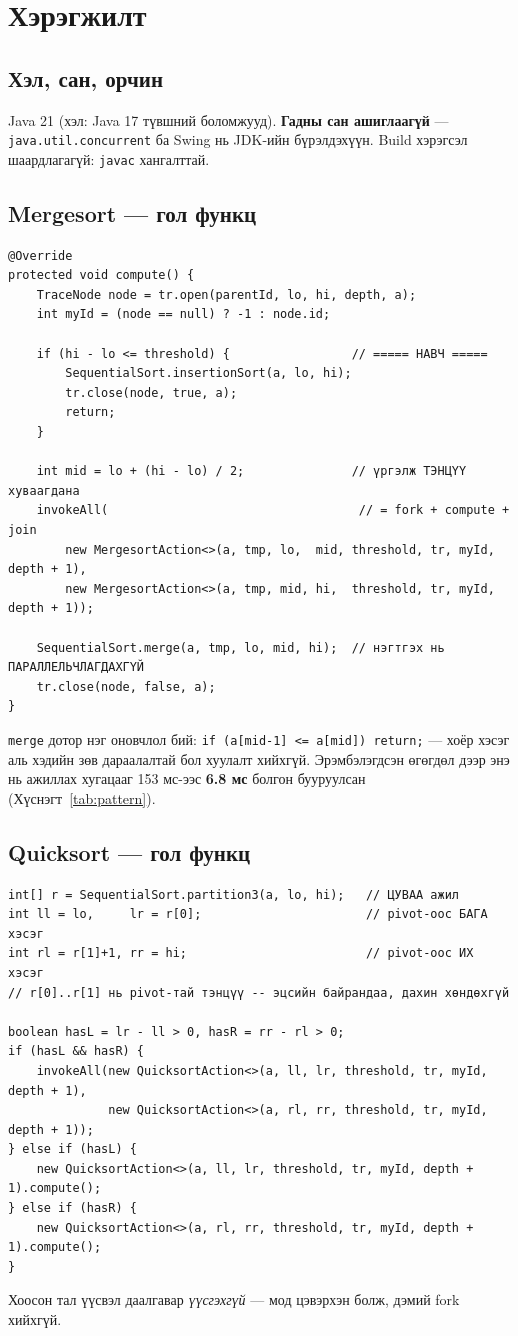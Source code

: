 \documentclass[11pt,a4paper]{article}
\begin{document}
\section{Хэрэгжилт}

\subsection{Хэл, сан, орчин}
Java 21 (хэл: Java 17 түвшний боломжууд). \textbf{Гадны сан ашиглаагүй} ---
\texttt{java.util.concurrent} ба Swing нь JDK-ийн бүрэлдэхүүн. Build хэрэгсэл
шаардлагагүй: \texttt{javac} хангалттай.

\subsection{Mergesort --- гол функц}
\begin{lstlisting}
@Override
protected void compute() {
    TraceNode node = tr.open(parentId, lo, hi, depth, a);
    int myId = (node == null) ? -1 : node.id;

    if (hi - lo <= threshold) {                 // ===== НАВЧ =====
        SequentialSort.insertionSort(a, lo, hi);
        tr.close(node, true, a);
        return;
    }

    int mid = lo + (hi - lo) / 2;               // үргэлж ТЭНЦҮҮ хуваагдана
    invokeAll(                                   // = fork + compute + join
        new MergesortAction<>(a, tmp, lo,  mid, threshold, tr, myId, depth + 1),
        new MergesortAction<>(a, tmp, mid, hi,  threshold, tr, myId, depth + 1));

    SequentialSort.merge(a, tmp, lo, mid, hi);  // нэгтгэх нь ПАРАЛЛЕЛЬЧЛАГДАХГҮЙ
    tr.close(node, false, a);
}
\end{lstlisting}

\texttt{merge} дотор нэг оновчлол бий: \texttt{if (a[mid-1] <= a[mid]) return;}
--- хоёр хэсэг аль хэдийн зөв дараалалтай бол хуулалт хийхгүй. Эрэмбэлэгдсэн
өгөгдөл дээр энэ нь ажиллах хугацааг 153 мс-ээс \textbf{6.8 мс} болгон бууруулсан
(Хүснэгт~\ref{tab:pattern}).

\subsection{Quicksort --- гол функц}
\begin{lstlisting}
int[] r = SequentialSort.partition3(a, lo, hi);   // ЦУВАА ажил
int ll = lo,     lr = r[0];                       // pivot-оос БАГА хэсэг
int rl = r[1]+1, rr = hi;                         // pivot-оос ИХ хэсэг
// r[0]..r[1] нь pivot-тай тэнцүү -- эцсийн байрандаа, дахин хөндөхгүй

boolean hasL = lr - ll > 0, hasR = rr - rl > 0;
if (hasL && hasR) {
    invokeAll(new QuicksortAction<>(a, ll, lr, threshold, tr, myId, depth + 1),
              new QuicksortAction<>(a, rl, rr, threshold, tr, myId, depth + 1));
} else if (hasL) {
    new QuicksortAction<>(a, ll, lr, threshold, tr, myId, depth + 1).compute();
} else if (hasR) {
    new QuicksortAction<>(a, rl, rr, threshold, tr, myId, depth + 1).compute();
}
\end{lstlisting}
Хоосон тал үүсвэл даалгавар \emph{үүсгэхгүй} --- мод цэвэрхэн болж, дэмий
fork хийхгүй.
\end{document}
